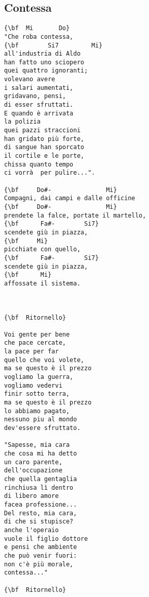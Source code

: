 \documentclass[a4paper]{article}
\begin{document}
\subsection{Contessa}
\begin{multicols}{2}\begin{Verbatim}[commandchars=\\\{\}]
{\bf  Mi       Do}
"Che roba contessa,
{\bf        Si7         Mi}
all'industria di Aldo
han fatto uno sciopero
quei quattro ignoranti;
volevano avere
i salari aumentati,
gridavano, pensi,
di esser sfruttati.
E quando è arrivata
la polizia
quei pazzi straccioni
han gridato più forte,
di sangue han sporcato
il cortile e le porte,
chissa quanto tempo
ci vorrà  per pulire...".

{\bf     Do#-               Mi}
Compagni, dai campi e dalle officine
{\bf     Do#-               Mi}
prendete la falce, portate il martello,
{\bf      Fa#-        Si7}
scendete giù in piazza,
{\bf     Mi}
picchiate con quello,
{\bf      Fa#-        Si7}
scendete giù in piazza,
{\bf      Mi}
affossate il sistema.



{\bf  Ritornello}

Voi gente per bene
che pace cercate,
la pace per far
quello che voi volete,
ma se questo è il prezzo
vogliamo la guerra,
vogliamo vedervi
finir sotto terra,
ma se questo è il prezzo
lo abbiamo pagato,
nessuno piu al mondo
dev'essere sfruttato.

"Sapesse, mia cara
che cosa mi ha detto
un caro parente,
dell'occupazione
che quella gentaglia
rinchiusa lì dentro
di libero amore
facea professione...
Del resto, mia cara,
di che si stupisce?
anche l'operaio
vuole il figlio dottore
e pensi che ambiente
che può venir fuori:
non c'è più morale,
contessa..."

{\bf  Ritornello}

\end{Verbatim}
\end{multicols}\newpage
\end{document}
